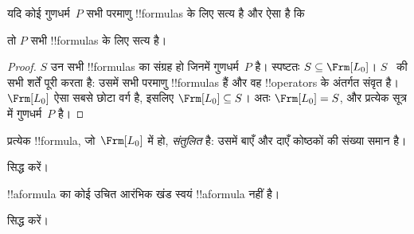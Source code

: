 \documentclass[../../../include/open-logic-section]{subfiles}
\begin{document}


\begin{thm}
  यदि कोई गुणधर्म~$P$ सभी परमाणु !!{formula}s के लिए सत्य है और ऐसा है कि
  \begin{enumerate}
  \end{enumerate}
  तो $P$ सभी !!{formula}s के लिए सत्य है।
\end{thm}

\begin{proof}
  $S$ उन सभी !!{formula}s का संग्रह हो जिनमें गुणधर्म~$P$ है। स्पष्टतः
  $S \subseteq \Frm[L_0]$। $S$~ की सभी शर्तें
  पूरी करता है: उसमें सभी परमाणु !!{formula}s हैं और वह !!{operator}s के
  अंतर्गत संवृत है। $\Frm[L_0]$ ऐसा सबसे छोटा वर्ग है, इसलिए
  $\Frm[L_0] \subseteq S$। अतः $\Frm[L_0] = S$, और प्रत्येक सूत्र में
  गुणधर्म~$P$ है।
\end{proof}

\begin{prop}
   प्रत्येक !!{formula}, जो~$\Frm[L_0]$ में हो, \emph{संतुलित} है: उसमें
   बाएँ और दाएँ कोष्ठकों की संख्या समान है।
\end{prop}

\begin{prob}
 सिद्ध करें।
\end{prob}

\begin{prop} 
!!a{formula} का कोई उचित आरंभिक खंड स्वयं !!a{formula} नहीं है।
\end{prop}

\begin{prob}
   सिद्ध करें।
\end{prob}
\end{document}
